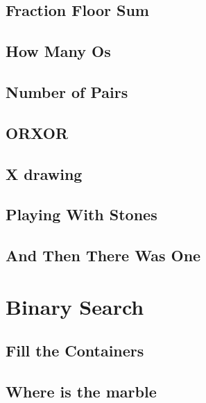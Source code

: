         \subsection{Fraction Floor Sum}
                
        \subsection{How Many Os}
                
        \subsection{Number of Pairs}
                
        \subsection{ORXOR}
                
        \subsection{X drawing}
                
        \subsection{Playing With Stones}
                
        \subsection{And Then There Was One}
                

\section{Binary Search}
        \subsection{Fill the Containers}
                
        \subsection{Where is the marble}
                

